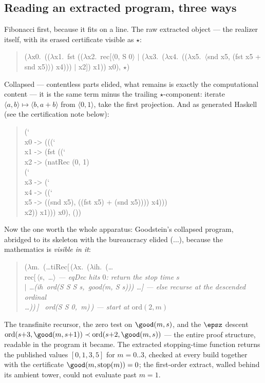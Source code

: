 \subsection*{Reading an extracted program, three ways}

Fibonacci first, because it fits on a line. The raw extracted object ---
the realizer itself, with its erased certificate visible as $\star$:
\begin{quote}\ttfamily\small
($\lambda$x0.\ (($\lambda$x1.\ fst (($\lambda$x2.\ rec[$\langle$0, S 0$\rangle$
$\mid$ ($\lambda$x3.\ ($\lambda$x4.\ (($\lambda$x5.\ $\langle$snd x5, (fst x5 + snd
x5)$\rangle$) x4))) $\mid$ x2]) x1)) x0), $\star$)
\end{quote}
Collapsed --- contentless parts elided, what remains is exactly the
computational content --- it is the same term minus the trailing
$\star$-component: iterate $\langle a,b\rangle \mapsto \langle b,
a{+}b\rangle$ from $\langle 0,1\rangle$, take the first projection. And as
generated Haskell (see the certification note below):
\begin{quote}\ttfamily\small
(\char`\\ x0 -> (((\char`\\ x1 -> (fst ((\char`\\ x2 -> (natRec (0, 1)\\
\hspace*{1.2em}(\char`\\ x3 -> (\char`\\ x4 -> ((\char`\\ x5 -> ((snd x5), ((fst x5) + (snd x5)))) x4)))\\
\hspace*{1.2em}x2)) x1))) x0), ())
\end{quote}

Now the one worth the whole apparatus: Goodstein's collapsed program,
abridged to its skeleton with the bureaucracy elided ($\ldots$), because the
mathematics is \emph{visible in it}:
\begin{quote}\ttfamily\small
($\lambda$m.\ (\dots tiRec[\,($\lambda$x.\ ($\lambda$ih.\ (\dots\\
\hspace*{1.2em}rec[\,$\langle$s,\ \dots$\rangle$
  \hfill\normalfont\itshape --- eqDec hits $0$: return the stop time $s$\\
\hspace*{1.2em}$\mid$ \dots (ih\ ord(S S S s,\ good(m, S s))) \dots]
  \hfill\normalfont\itshape --- else recurse at the descended ordinal\\
\dots))\,] \ ord(S S 0,\ m)\,)
  \hfill\normalfont\itshape --- start at $\mathrm{ord}(2,m)$
\end{quote}
The transfinite recursor, the zero test on $\good(m,s)$, and the $\epsz$
descent $\mathrm{ord}(s{+}3, \good(m,s{+}1)) \prec \mathrm{ord}(s{+}2,
\good(m,s))$ --- the entire proof structure, readable in the program it
became. The extracted stopping-time function returns the published values
$[0,1,3,5]$ for $m=0..3$, checked at every build together with the
certificate $\good(m, \mathrm{stop}(m))=0$; the first-order extract, walled
behind its ambient tower, could not evaluate past $m=1$.

